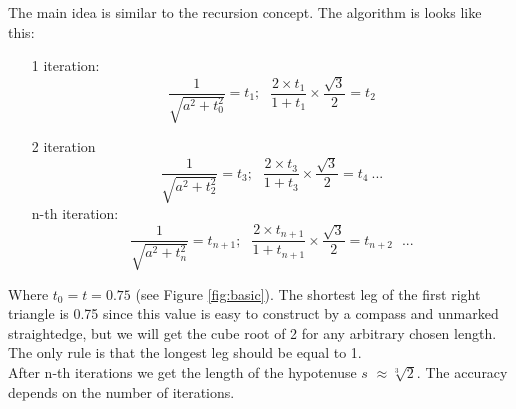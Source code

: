 \documentclass[12pt, letterpaper, oneside]{report}
\begin{document}
The main idea is similar to the recursion concept. 
The algorithm is looks like this:
\begin{enumerate}
\item[1] iteration:
\begin{equation}
\dfrac{1}{\sqrt{a^{2}+t_{0}^{2}}}=t_{1};\ \hspace{5pt} \frac{2\times t_{1}}{1+t_{1}}\times\frac{\sqrt{3}}{2}=t_{2}
\end{equation}
\item[2] iteration
\begin{equation}
 \dfrac{1}{\sqrt{a^{2}+t_{2}^{2}}}=t_{3};\ \hspace{5pt} \frac{2\times t_{3}}{1+t_{3}}\times\frac{\sqrt{3}}{2}=t_{4} \ ...
\end{equation}
\subitem n-th iteration:
\begin{equation}
\dfrac{1}{\sqrt{a^{2}+t_{n}^{2}}}=t_{n+1};\ \hspace{5pt} \frac{2\times t_{n+1}}{1+t_{n+1}}\times\frac{\sqrt{3}}{2}=t_{n+2} \ \hspace{5pt} ...
\end{equation}
\end{enumerate}
Where $t_{0}=t=0.75$ (see Figure \ref{fig:basic}). The shortest leg of the first right triangle is 0.75 since this value is easy to construct by a compass and unmarked straightedge, but we will get the cube root of 2 for any arbitrary chosen length. The only rule is that the longest leg  should be equal to 1.
\\ 
After n-th iterations we get the length of the hypotenuse $s$
 $\approx\sqrt[3]{2}$. The accuracy depends on the number of iterations.\\ 
\end{document}
